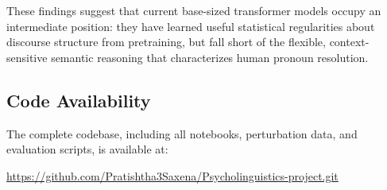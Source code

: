 \documentclass[11pt]{article}
\begin{document}
These findings suggest that current base-sized transformer models occupy an intermediate position: they have learned useful statistical regularities about discourse structure from pretraining, but fall short of the flexible, context-sensitive semantic reasoning that characterizes human pronoun resolution.

\subsection*{Code Availability}

The complete codebase, including all notebooks, perturbation data, and evaluation scripts, is available at:
\begin{center}
\url{https://github.com/Pratishtha3Saxena/Psycholinguistics-project.git}
\end{center}



\end{document}
